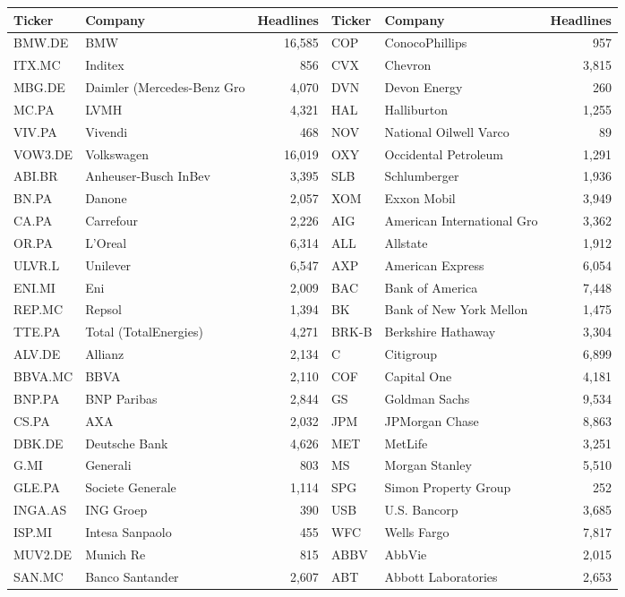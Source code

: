 \begin{tabular}{llrllr}
\toprule
Ticker & Company & Headlines & Ticker & Company & Headlines \\
\midrule
BMW.DE & BMW & 16,585 & COP & ConocoPhillips & 957 \\
ITX.MC & Inditex & 856 & CVX & Chevron & 3,815 \\
MBG.DE & Daimler (Mercedes-Benz Gro & 4,070 & DVN & Devon Energy & 260 \\
MC.PA & LVMH & 4,321 & HAL & Halliburton & 1,255 \\
VIV.PA & Vivendi & 468 & NOV & National Oilwell Varco & 89 \\
VOW3.DE & Volkswagen & 16,019 & OXY & Occidental Petroleum & 1,291 \\
ABI.BR & Anheuser-Busch InBev & 3,395 & SLB & Schlumberger & 1,936 \\
BN.PA & Danone & 2,057 & XOM & Exxon Mobil & 3,949 \\
CA.PA & Carrefour & 2,226 & AIG & American International Gro & 3,362 \\
OR.PA & L'Oreal & 6,314 & ALL & Allstate & 1,912 \\
ULVR.L & Unilever & 6,547 & AXP & American Express & 6,054 \\
ENI.MI & Eni & 2,009 & BAC & Bank of America & 7,448 \\
REP.MC & Repsol & 1,394 & BK & Bank of New York Mellon & 1,475 \\
TTE.PA & Total (TotalEnergies) & 4,271 & BRK-B & Berkshire Hathaway & 3,304 \\
ALV.DE & Allianz & 2,134 & C & Citigroup & 6,899 \\
BBVA.MC & BBVA & 2,110 & COF & Capital One & 4,181 \\
BNP.PA & BNP Paribas & 2,844 & GS & Goldman Sachs & 9,534 \\
CS.PA & AXA & 2,032 & JPM & JPMorgan Chase & 8,863 \\
DBK.DE & Deutsche Bank & 4,626 & MET & MetLife & 3,251 \\
G.MI & Generali & 803 & MS & Morgan Stanley & 5,510 \\
GLE.PA & Societe Generale & 1,114 & SPG & Simon Property Group & 252 \\
INGA.AS & ING Groep & 390 & USB & U.S. Bancorp & 3,685 \\
ISP.MI & Intesa Sanpaolo & 455 & WFC & Wells Fargo & 7,817 \\
MUV2.DE & Munich Re & 815 & ABBV & AbbVie & 2,015 \\
SAN.MC & Banco Santander & 2,607 & ABT & Abbott Laboratories & 2,653 \\

\end{tabular}
